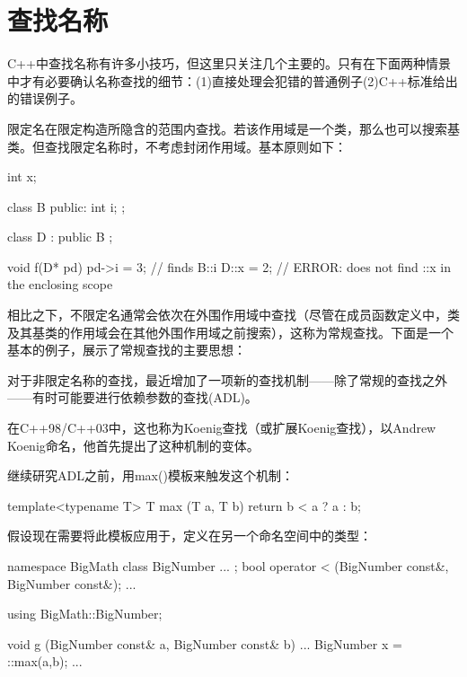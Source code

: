 \section{查找名称}

C++中查找名称有许多小技巧，但这里只关注几个主要的。只有在下面两种情景中才有必要确认名称查找的细节：(1)直接处理会犯错的普通例子(2)C++标准给出的错误例子。

限定名在限定构造所隐含的范围内查找。若该作用域是一个类，那么也可以搜索基类。但查找限定名称时，不考虑封闭作用域。基本原则如下：

\begin{cpp}
int x;

class B {
	public:
	int i;
};

class D : public B {};

void f(D* pd) {
	pd->i = 3; // finds B::i
	D::x = 2; // ERROR: does not find ::x in the enclosing scope
}
\end{cpp}

相比之下，不限定名通常会依次在外围作用域中查找（尽管在成员函数定义中，类及其基类的作用域会在其他外围作用域之前搜索），这称为常规查找。下面是一个基本的例子，展示了常规查找的主要思想：


对于非限定名称的查找，最近增加了一项新的查找机制——除了常规的查找之外——有时可能要进行依赖参数的查找(ADL)。

\begin{notice}
在C++98/C++03中，这也称为Koenig查找（或扩展Koenig查找），以Andrew Koenig命名，他首先提出了这种机制的变体。
\end{notice}

继续研究ADL之前，用max()模板来触发这个机制：

\begin{cpp}
template<typename T>
T max (T a, T b) {
	return b < a ? a : b;
}
\end{cpp}

假设现在需要将此模板应用于，定义在另一个命名空间中的类型：

\begin{cpp}
namespace BigMath {
	class BigNumber {
		...
	};
	bool operator < (BigNumber const&, BigNumber const&);
	...
}

using BigMath::BigNumber;

void g (BigNumber const& a, BigNumber const& b) {
	...
	BigNumber x = ::max(a,b);
	...
}
\end{cpp}

